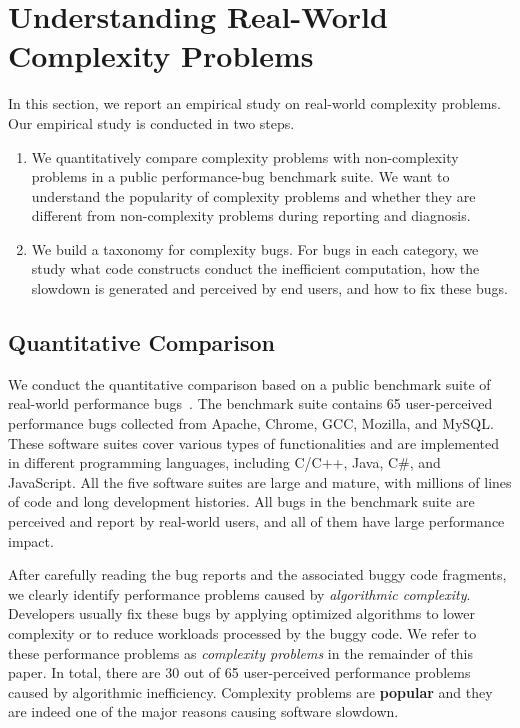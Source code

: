 \section{Understanding Real-World Complexity Problems}
\label{sec:study}



In this section, we report an empirical study on real-world 
complexity problems. Our empirical study is conducted in two steps.

\begin{enumerate}

\item 
We quantitatively compare complexity problems with non-complexity problems
in a public performance-bug benchmark suite. 
We want to understand the popularity of complexity problems 
and whether they are different from non-complexity 
problems during reporting and diagnosis. 

\item We build a taxonomy for complexity bugs. 
For bugs in each category, 
we study what code constructs conduct the inefficient computation,
how the slowdown is generated and perceived by end users, 
and how to fix these bugs. 

\end{enumerate}


\subsection{Quantitative Comparison}
\label{sec:compare}

We conduct the quantitative comparison based on a public benchmark 
suite of real-world performance bugs~\cite{PerfBug,SongOOPSLA2014,ldoctor}.
The benchmark suite contains 65 user-perceived performance bugs 
collected from  Apache, Chrome, GCC, Mozilla, and MySQL. 
These software suites cover various types of functionalities and are implemented 
in different programming languages, including C/C++, Java, C\#, and JavaScript. 
All the five software suites are large and mature, 
with millions of lines of code and long development histories. 
All bugs in the benchmark suite are perceived and report by real-world users, 
and all of them have large performance impact. 

After carefully reading the bug reports and the associated buggy code fragments,
we clearly identify \ComBugs performance problems 
caused by {\textit{algorithmic complexity}}.
Developers usually fix these bugs by applying optimized algorithms to lower complexity
or to reduce workloads processed by the buggy code. 
We refer to these performance problems as 
{\textit{complexity problems}} in the remainder of this paper.
In total, there are 30 out of 65 user-perceived performance problems 
caused by algorithmic inefficiency. 
Complexity problems are \textbf{popular} and 
they are indeed one of the major reasons causing software slowdown.

